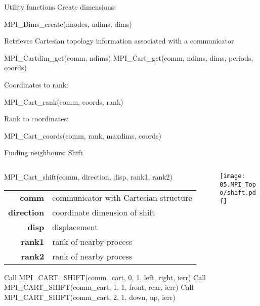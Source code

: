 \documentclass[aspectratio=43]{beamer}
\begin{document}
\begin{frame}[fragile]{Utility functions}
Create dimensions:
\begin{Pseudolisting}[]{}
MPI_Dims_create(nnodes, ndims, dims)
\end{Pseudolisting}

Retrieves Cartesian topology information associated with a communicator
\begin{Pseudolisting}[]{}
MPI_Cartdim_get(comm, ndims)
MPI_Cart_get(comm, ndims, dims, periods, coords)
\end{Pseudolisting}
Coordinates to rank:
\begin{Pseudolisting}[]{}
MPI_Cart_rank(comm, coords, rank)
\end{Pseudolisting}
Rank to coordinates:
\begin{Pseudolisting}[]{}
MPI_Cart_coords(comm, rank, maxdims, coords)
\end{Pseudolisting}
\end{frame}


\begin{frame}[fragile]{Finding neighbours: Shift}
\begin{columns}
\begin{column}{0.65\paperwidth}
\begin{Pseudolisting}[]{}
MPI_Cart_shift(comm, direction, disp, 
               rank1, rank2)
\end{Pseudolisting}
\begin{black1block}{}
\begin{tabular}{rp{8cm}}
\textbf{comm} & communicator with Cartesian structure\\
\textbf{direction} & coordinate dimension of shift\\
\textbf{disp} & displacement\\
\textbf{rank1} & rank of nearby process\\
\textbf{rank2} & rank of nearby process\\
\end{tabular}
\end{black1block}
\begin{Fortranlisting}[]{}
Call MPI_CART_SHIFT(comm_cart, 0, 1,
                    left, right, ierr)
Call MPI_CART_SHIFT(comm_cart, 1, 1,
                    front, rear, ierr)
Call MPI_CART_SHIFT(comm_cart, 2, 1,
                    down, up, ierr)
\end{Fortranlisting}

\end{column}
\begin{column}{0.3\paperwidth}
\vspace{4cm}
\texttt{[image: 05.MPI\_Topo/shift.pdf]}
\end{column}
\end{columns}

\end{frame}
\end{document}
